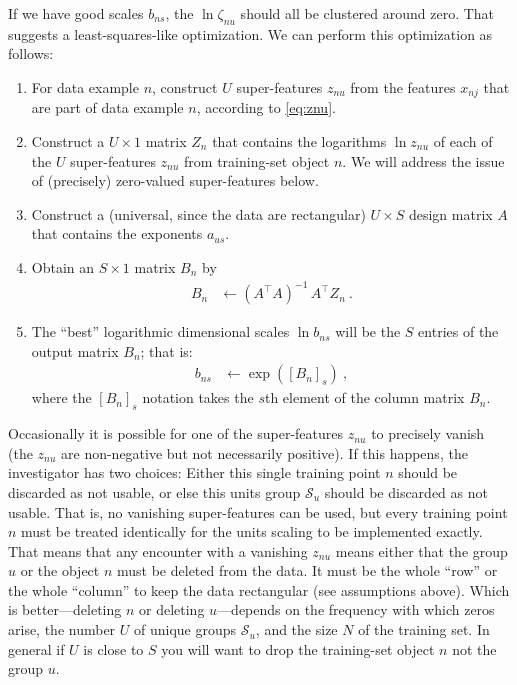 \documentclass{article}
\newcommand{\set}[1]{\mathcal{#1}}
\newcommand{\setS}{\set{S}}
\begin{document}
If we have good scales $b_{ns}$, the $\ln\zeta_{nu}$ should all be clustered around zero.
That suggests a least-squares-like optimization.
We can perform this optimization as follows:
\begin{enumerate}
  \item For data example $n$, construct $U$ super-features $z_{nu}$ from the features $x_{nj}$ that are part of data example $n$, according to \eqref{eq:znu}.
  \item Construct a $U\times 1$ matrix $Z_n$ that contains the logarithms $\ln z_{nu}$ of each of the $U$ super-features $z_{nu}$ from training-set object $n$.
We will address the issue of (precisely) zero-valued super-features below.
  \item Construct a (universal, since the data are rectangular) $U\times S$ design matrix $A$ that contains the exponents $a_{us}$.
  \item Obtain an $S\times 1$ matrix $B_n$ by
  \begin{align}\label{eq:Bn}
      B_n &\leftarrow (A^\top A)^{-1}\,A^\top Z_n ~.
  \end{align}
\item The ``best'' logarithmic dimensional scales $\ln b_{ns}$ will be the $S$ entries of the output matrix $B_n$; that is:
\begin{align}
    b_{ns} &\leftarrow \exp([B_n]_s) ~,
\end{align}
where the $[B_n]_s$ notation takes the $s$th element of the column matrix $B_n$.
\end{enumerate}

Occasionally it is possible for one of the super-features $z_{nu}$ to precisely vanish (the $z_{nu}$ are non-negative but not necessarily positive).
If this happens, the investigator has two choices:
Either this single training point $n$ should be discarded as not usable, or else this units group $\setS_u$ should be discarded as not usable.
That is, no vanishing super-features can be used, but every training point $n$ must be treated identically for the units scaling to be implemented exactly.
That means that any encounter with a vanishing $z_{nu}$ means either that the group $u$ or the object $n$ must be deleted from the data.
It must be the whole ``row'' or the whole ``column'' to keep the data rectangular (see assumptions above).
Which is better---deleting $n$ or deleting $u$---depends on the frequency with which zeros arise, the number $U$ of unique groups $\setS_u$, and the size $N$ of the training set. In general if $U$ is close to $S$ you will want to drop the training-set object $n$ not the group $u$.
\end{document}
